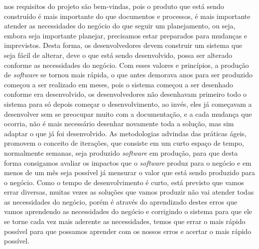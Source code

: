    nos requisitos do projeto são bem-vindas, pois o produto que está sendo
    construído é mais importante do que documentos e processos, é mais
    importante atender as necessidades do negócio do que seguir um planejamento,
    ou seja, embora seja importante planejar, precisamos estar preparados para
    mudanças e imprevistos. Desta forma, os desenvolvedores devem construir
    um sistema que seja fácil de alterar, deve o que está sendo
    desenvolvido, possa ser alterado conforme as necessidades do negócio. \newline
    Com esses valores e princípios, a produção de \textit{software} se tornou
    mais rápida, o que antes demorava anos para ser produzido começou a ser
    realizado em meses, pois o sistema começou a ser desenhado conforme era
    desenvolvido, os desenvolvedores não desenhavam primeiro todo o sistema
    para só depois começar o desenvolvimento, ao invés, eles já começavam a
    desenvolver sem se preocupar muito com a documentação, e a cada mudança
    que ocorria, não é mais necessário desenhar novamente toda a solução, mas
    sim adaptar o que já foi desenvolvido. \newline
    As metodologias advindas das práticas ágeis, promovem o conceito de iterações,
    que consiste em um curto espaço de tempo, normalmente semanas, seja produzido
    \textit{software} em produção, para que desta forma consigamos avaliar os
    impactos que o \textit{software} produz para o negócio e em menos de um
    mês seja possível já mensurar o valor que está sendo produzido para o
    negócio. Como o tempo de desenvolvimento é curto, está previsto que vamos
    errar diversas, muitas vezes as soluções que vamos produzir não vai atender
    todas as necessidades do negócio, porém é através do aprendizado destes erros
    que vamos aprendendo as necessidades do negócio e corrigindo o sistema para
    que ele se torne cada vez mais aderente as necessidades, temos que errar o
    mais rápido possível para que possamos aprender com os nossos erros e acertar
    o mais rápido possível.

